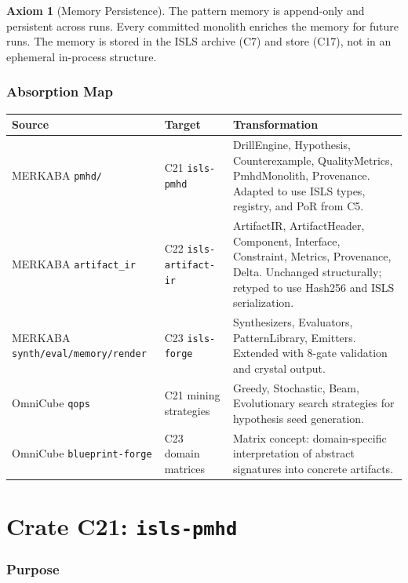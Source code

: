 \documentclass[11pt,a4paper,twoside]{article}
\theoremstyle{definition}
\newtheorem{axiom}{Axiom}[section]
\theoremstyle{plain}
\theoremstyle{remark}
\newcommand{\ISLS}{\textsf{ISLS}}
\begin{document}
\begin{axiom}[Memory Persistence]\label{ax:memory}
The pattern memory is append-only and persistent across runs. Every
committed monolith enriches the memory for future runs. The memory
is stored in the \ISLS{} archive (C7) and store (C17), not in an
ephemeral in-process structure.
\end{axiom}


\section{Absorption Map}\label{sec:absorb}

\begin{tabularx}{\textwidth}{l l X}
\toprule
\textbf{Source} & \textbf{Target} & \textbf{Transformation} \\
\midrule
MERKABA \texttt{pmhd/} & C21 \texttt{isls-pmhd} & DrillEngine,
  Hypothesis, Counterexample, QualityMetrics, PmhdMonolith,
  Provenance. Adapted to use \ISLS{} types, registry, and PoR
  from C5. \\
MERKABA \texttt{artifact\_ir} & C22 \texttt{isls-artifact-ir} &
  ArtifactIR, ArtifactHeader, Component, Interface, Constraint,
  Metrics, Provenance, Delta. Unchanged structurally; retyped to
  use Hash256 and \ISLS{} serialization. \\
MERKABA \texttt{synth/eval/memory/render} & C23 \texttt{isls-forge} &
  Synthesizers, Evaluators, PatternLibrary, Emitters. Extended with
  8-gate validation and crystal output. \\
OmniCube \texttt{qops} & C21 mining strategies & Greedy, Stochastic,
  Beam, Evolutionary search strategies for hypothesis seed
  generation. \\
OmniCube \texttt{blueprint-forge} & C23 domain matrices & Matrix
  concept: domain-specific interpretation of abstract signatures
  into concrete artifacts. \\
\bottomrule
\end{tabularx}


\part{Crate C21: \texttt{isls-pmhd}}\label{part:pmhd}

\section{Purpose}\label{sec:pmhd:purpose}
\end{document}
